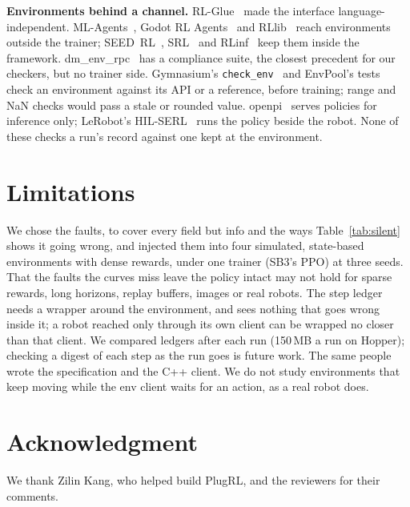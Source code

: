 \documentclass[conference]{IEEEtran}
\newif\ifanon
\begin{document}
\textbf{Environments behind a channel.} RL-Glue~\cite{tanner2009rlglue}
made the interface language-independent. ML-Agents~\cite{juliani2018unity},
Godot RL Agents~\cite{beeching2021godot} and RLlib~\cite{liang2018rllib}
reach environments outside the trainer; SEED~RL~\cite{espeholt2020seed},
SRL~\cite{mei2024srl} and RLinf~\cite{yu2025rlinf} keep them inside the
framework. dm\_env\_rpc~\cite{dmenvrpc} has a compliance
suite, the closest precedent for our checkers, but no trainer side.
Gymnasium's \texttt{check\_env}~\cite{farama2023envchecker} and EnvPool's
tests~\cite{weng2022envpool} check an environment against its API or a
reference, before training; range and NaN checks would pass a stale
or rounded value. openpi~\cite{openpi2025} serves policies for inference
only; LeRobot's HIL-SERL~\cite{cadene2024lerobot} runs the policy beside the
robot. None
of these checks a run's record against one kept at the
environment.

\section{Limitations}

We chose the faults, to cover every field but info and the ways
Table~\ref{tab:silent} shows it going wrong, and injected them into four
simulated, state-based environments with dense rewards, under one trainer
(SB3's PPO) at three seeds. That the faults the curves miss leave the
policy intact may not hold for sparse rewards, long horizons, replay
buffers, images or real robots. The step ledger needs a wrapper around the
environment, and sees nothing that goes wrong inside it; a robot reached
only through its own client can be wrapped no closer than that client. We
compared ledgers after each run (150\,MB a run on Hopper); checking a
digest of each step as the run goes is future work. The same people wrote
the specification and the C++ client. We do not study environments that
keep moving while the env client waits for an action, as a real robot does.

\ifanon\else
\section*{Acknowledgment}
We thank Zilin Kang, who helped build PlugRL, and the reviewers for their
comments.
\fi




\appendices
\raggedbottom
\end{document}

